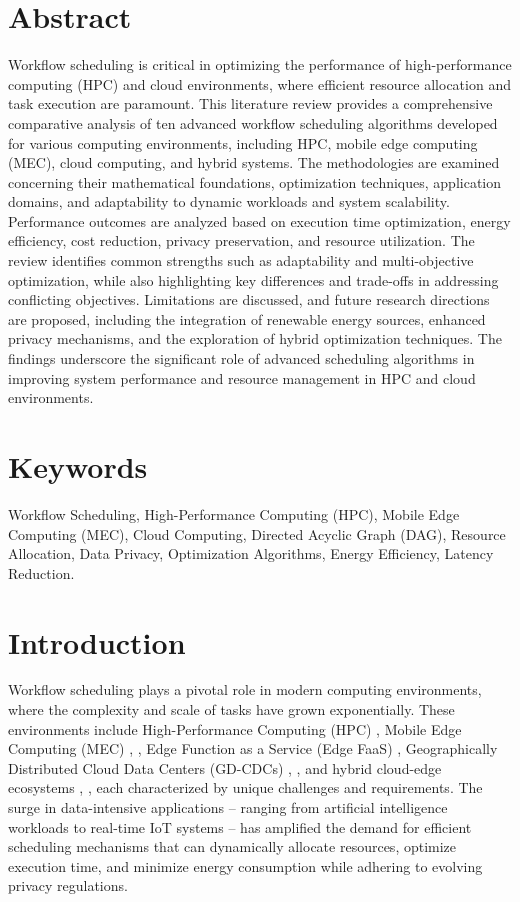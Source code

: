 \documentclass[a4paper, final]{article}
\begin{document}
\newpage

\section*{Abstract}
Workflow scheduling is critical in optimizing the performance of high-performance computing (HPC) and 
cloud environments, where efficient resource allocation and task execution are paramount. This literature 
review provides a comprehensive comparative analysis of ten advanced workflow scheduling algorithms developed 
for various computing environments, including HPC, mobile edge computing (MEC), cloud computing, and hybrid systems. 
The methodologies are examined concerning their mathematical foundations, optimization techniques, application domains, 
and adaptability to dynamic workloads and system scalability. Performance outcomes are analyzed based on execution time 
optimization, energy efficiency, cost reduction, privacy preservation, and resource utilization. The review identifies 
common strengths such as adaptability and multi-objective optimization, while also highlighting key differences and 
trade-offs in addressing conflicting objectives. Limitations are discussed, and future research directions are proposed, 
including the integration of renewable energy sources, enhanced privacy mechanisms, and the exploration of hybrid 
optimization techniques. The findings underscore the significant role of advanced scheduling algorithms in improving 
system performance and resource management in HPC and cloud environments.

\newpage
\section*{Keywords}
Workflow Scheduling, High-Performance Computing (HPC), Mobile Edge Computing (MEC), Cloud Computing, 
Directed Acyclic Graph (DAG), Resource Allocation, Data Privacy, Optimization Algorithms, 
Energy Efficiency, Latency Reduction.

\newpage
\cleardoublepage
{}
\section{Introduction}
Workflow scheduling plays a pivotal role in modern computing environments, where the complexity and scale of tasks have 
grown exponentially. These environments include High-Performance Computing (HPC) \cite{bib:1_acrl}, Mobile Edge 
Computing (MEC) \cite{bib:2_faro}, \cite{bib:6_marine}, Edge Function as a Service (Edge FaaS) \cite{bib:4_faas}, 
Geographically Distributed Cloud Data Centers (GD-CDCs) \cite{bib:5_epee}, \cite{bib:7_ppps}, and hybrid cloud-edge 
ecosystems \cite{bib:8}, \cite{bib:9}, each characterized by unique challenges and requirements. The surge in data-intensive 
applications -- ranging from artificial intelligence workloads to real-time IoT systems -- has amplified the demand for 
efficient scheduling mechanisms that can dynamically allocate resources, optimize execution time, and minimize energy 
consumption while adhering to evolving privacy regulations.
\end{document}
